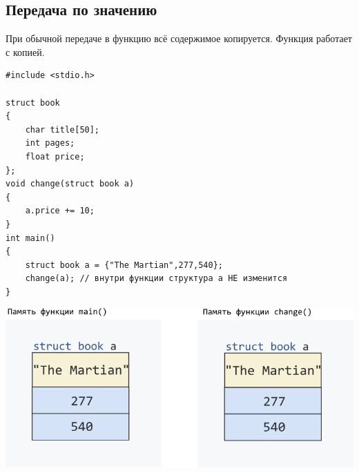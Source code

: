 \documentclass{article}
\begin{document}
\subsection*{Передача по значению}
При обычной передаче в функцию всё содержимое копируется. Функция работает с копией.
\begin{lstlisting}
#include <stdio.h>

struct book 
{
    char title[50];
    int pages;
    float price;
};
void change(struct book a) 
{
    a.price += 10;
}
int main()
{
    struct book a = {"The Martian",277,540};
    change(a); // внутри функции структура a НЕ изменится
}
\end{lstlisting}
\begin{center}
\includegraphics[scale=0.6]{../images/structpassbyvalue.png}
\end{center}
\end{document}
